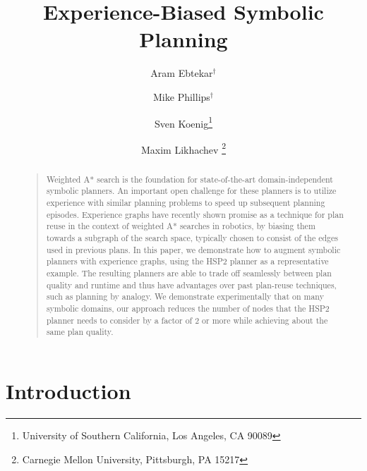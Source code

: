 \documentclass[letterpaper]{article}
\begin{document}
%
\title{Experience-Biased Symbolic Planning}
\author{Aram Ebtekar$^\dagger$ \and Mike Phillips$^\dagger$ \and Sven Koenig\thanks{University of Southern California, Los Angeles, CA 90089} \and Maxim Likhachev%
\thanks{Carnegie Mellon University, Pittsburgh, PA 15217}%
%
}
\maketitle
\begin{abstract}
\begin{quote}
Weighted A* search is the foundation for state-of-the-art domain-independent symbolic planners.
An important open challenge for these planners is to utilize experience with similar planning problems to speed up subsequent planning episodes.
Experience graphs have recently shown promise as a technique for plan reuse in the context of weighted A* searches in robotics, by biasing them towards a subgraph of the search space, typically chosen to consist of the edges used in previous plans.
In this paper, we demonstrate how to augment symbolic planners with
experience graphs, using the HSP2 planner as a representative
example.
The resulting planners are able to trade off seamlessly
between plan quality and runtime and thus have advantages over past
plan-reuse techniques, such as planning by analogy.
We demonstrate experimentally that on many symbolic domains, our approach reduces the number of nodes that the HSP2 planner needs to consider by a factor of 2 or more while achieving about the same plan quality.
\end{quote}
\end{abstract}

\section{Introduction}
\end{document}
